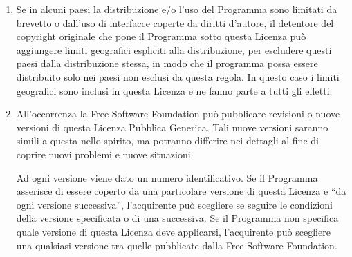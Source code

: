 \begin{enumerate}
  Se parti di questo comma sono ritenute non valide o
  inapplicabili per qualsiasi circostanza, deve comunque
  essere applicata l'idea espressa da questo comma; in ogni
  altra circostanza invece deve essere applicato il comma 7
  nel suo complesso.

  Non \`e nello scopo di questo comma indurre gli utenti a
  violare alcun brevetto n\'e ogni altra rivendicazione di
  diritti di propriet\`a, n\'e di contestare la validit\`a
  di alcuna di queste rivendicazioni; lo scopo di questo
  comma \`e solo quello di proteggere l'integrit\`a del
  sistema di distribuzione del software libero, che viene
  realizzato tramite l'uso della licenza pubblica. Molte
  persone hanno contribuito generosamente alla vasta gamma
  di programmi distribuiti attraverso questo sistema,
  basandosi sull'applicazione consistente di tale sistema.
  L'autore/donatore pu\`o decidere di sua volont\`a se
  preferisce distribuire il software avvalendosi di altri
  sistemi, e l'acquirente non pu\`o imporre la scelta del
  sistema di distribuzione.

  Questo comma serve a rendere il pi\`u chiaro possibile ci\`o
  che crediamo sia una conseguenza del resto di questa
  Licenza.

\item Se in alcuni paesi la distribuzione e/o l'uso del
  Programma sono limitati da brevetto o dall'uso di
  interfacce coperte da diritti d'autore, il detentore del
  copyright originale che pone il Programma sotto questa
  Licenza pu\`o aggiungere limiti geografici espliciti alla
  distribuzione, per escludere questi paesi dalla
  distribuzione stessa, in modo che il programma possa
  essere distribuito solo nei paesi non esclusi da questa
  regola. In questo caso i limiti geografici sono inclusi in
  questa Licenza e ne fanno parte a tutti gli effetti.

\item All'occorrenza la Free Software Foundation pu\`o
  pubblicare revisioni o nuove versioni di questa Licenza
  Pubblica Generica. Tali nuove versioni saranno simili a
  questa nello spirito, ma potranno differire nei dettagli
  al fine di coprire nuovi problemi e nuove situazioni.

  Ad ogni versione viene dato un numero identificativo. Se
  il Programma asserisce di essere coperto da una
  particolare versione di questa Licenza e ``da ogni
  versione successiva'', l'acquirente pu\`o scegliere se
  seguire le condizioni della versione specificata o di una
  successiva.  Se il Programma non specifica quale versione
  di questa Licenza deve applicarsi, l'acquirente pu\`o
  scegliere una qualsiasi versione tra quelle pubblicate
  dalla Free Software Foundation.


\end{enumerate}
